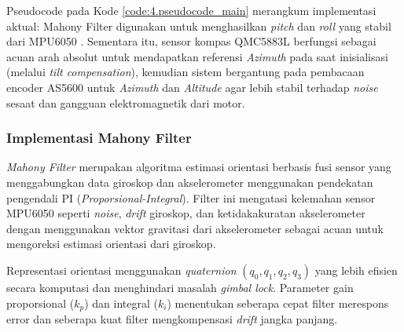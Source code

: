 Pseudocode pada Kode \ref{code:4.pseudocode_main} merangkum implementasi aktual: Mahony Filter digunakan untuk menghasilkan \textit{pitch} dan \textit{roll} yang stabil dari MPU6050 \cite{Mahony2007,Maton2024}. Sementara itu, sensor kompas QMC5883L berfungsi sebagai acuan arah absolut untuk mendapatkan referensi \textit{Azimuth} pada saat inisialisasi (melalui \textit{tilt compensation}), kemudian sistem bergantung pada pembacaan encoder AS5600 untuk \textit{Azimuth} dan \textit{Altitude} agar lebih stabil terhadap \textit{noise} sesaat dan gangguan elektromagnetik dari motor. \par

\subsubsection{Implementasi Mahony Filter} \label{IV.Software.Mahony}
\textit{Mahony Filter} merupakan algoritma estimasi orientasi berbasis fusi sensor yang menggabungkan data giroskop dan akselerometer menggunakan pendekatan pengendali PI (\textit{Proporsional-Integral}). Filter ini mengatasi kelemahan sensor MPU6050 seperti \textit{noise}, \textit{drift} giroskop, dan ketidakakuratan akselerometer dengan menggunakan vektor gravitasi dari akselerometer sebagai acuan untuk mengoreksi estimasi orientasi dari giroskop. \par

Representasi orientasi menggunakan \textit{quaternion} $(q_0, q_1, q_2, q_3)$ yang lebih efisien secara komputasi dan menghindari masalah \textit{gimbal lock}. Parameter gain proporsional ($k_p$) dan integral ($k_i$) menentukan seberapa cepat filter merespons error dan seberapa kuat filter mengkompensasi \textit{drift} jangka panjang. \par

